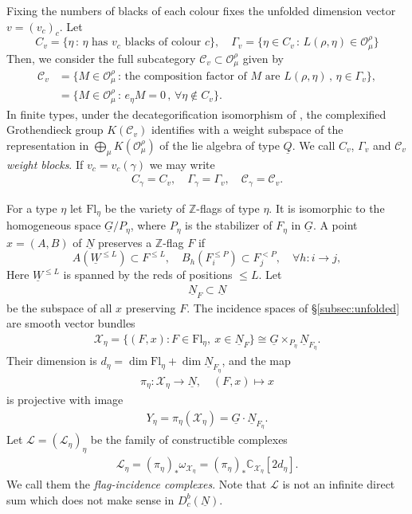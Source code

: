 \documentclass[11pt,reqno]{amsart}
\theoremstyle{definition}
\theoremstyle{remark}
\def\bbC{\mathbb C}
\def\bbZ{\mathbb Z}
\def\dN{\underline N}
\def\dG{\underline G}
\def\dW{\underline W}
\def\dQ{\underline Q}
\def\scrX{\mathscr X}
\def\scrO{\mathscr O}
\def\Fl{\mathrm{Fl}}
\begin{document}
Fixing the numbers of blacks of each colour fixes the unfolded dimension vector $v=(v_c)_c$.
Let 
$$C_v=\{\eta\,:\,\eta\text{ has $v_c$ blacks of colour }c\}
,\quad
\Gamma_v=\{\eta\in C_v\,:\,L(\rho,\eta)\in\scrO_\mu^\rho\}$$
Then, we consider the full subcategory $\mathscr C_v\subset\scrO_\mu^\rho$ given by
\begin{align*}
\mathscr C_v&=\{M\in\scrO_\mu^\rho\,:\,\text{the composition factor of }M\text{ are }L(\rho,\eta)\,,\,\eta\in\Gamma_v\},\\
&=\{M\in\scrO_\mu^\rho\,:\,e_\eta M=0\,,\,\forall \eta\notin C_v\}.
\end{align*}
In finite types, under the decategorification isomorphism of \cite{VV25}, the complexified Grothendieck group $K(\mathscr C_v)$
identifies with a weight subspace of the representation in $\bigoplus_\mu K(\scrO_\mu^\rho)$ of the lie algebra of type $\dQ$.
We call $C_v$, $\Gamma_v$ and $\mathscr C_v$ \emph{weight blocks}.
If $v_c=v_c(\gamma)$ we may write 
\begin{align}\label{CCG}
C_\gamma=C_v,\quad
\Gamma_\gamma=\Gamma_v,\quad
\mathscr C_\gamma=\mathscr C_v.
\end{align}

For a type $\eta$ let $\Fl_\eta$ be the variety of
$\bbZ$-flags of type $\eta$.
It is isomorphic to the homogeneous space $\dG/P_\eta$, where $P_\eta$ is the stabilizer of $F_\eta$ in $\dG$. 
A point $x=(A,B)$ of $\dN$ {preserves} a $\mathbb Z$-flag $F$ if
\begin{equation}\label{eq:NF}
A(\dW^{\leqslant L})\subset F^{\leqslant L},\quad B_h(F_i^{\leqslant P})\subset F_j^{<P},\quad \forall h:i\to j,
\end{equation}
Here $\dW^{\leqslant L}$ is spanned by the reds of positions $\leqslant L$. 
Let 
\begin{align}\label{NF}\dN_F\subset\dN\end{align}
 be the subspace of all $x$ preserving $F$. 
The incidence spaces of \S\ref{subsec:unfolded}
are smooth vector bundles
\begin{align}\label{X}
 \scrX_\eta=\{(F,x):F\in\Fl_\eta,\ x\in\dN_F\}
 \cong\dG\times_{P_\eta}\dN_{F_\eta}.
\end{align}
Their dimension is $d_\eta=\dim\Fl_\eta+\dim\dN_{F_\eta}$, and the map
\begin{align}\label{pi}
 \pi_\eta:\scrX_\eta\to\dN,\quad(F,x)\mapsto x
\end{align}
is projective with image 
\begin{align}\label{Y}Y_\eta=\pi_\eta(\scrX_\eta)=\dG\cdot\dN_{F_\eta}.\end{align}
Let $\mathscr L=(\mathscr L_\eta)_\eta $ be the family of constructible complexes
\begin{align}\label{L}\mathscr L_\eta=(\pi_\eta)_*\omega_{\scrX_\eta}=(\pi_\eta)_*\bbC_{\scrX_\eta}[2d_\eta].\end{align}
We call them the \emph{flag-incidence complexes}.
Note that $\mathscr L$ is not an infinite direct sum which does not make sense in $D^b_c(\dN)$.
\end{document}
